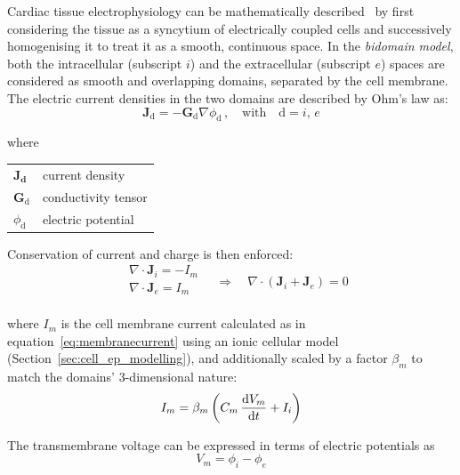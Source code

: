 \vspace{0.2cm}
Cardiac tissue electrophysiology can be mathematically described~\cite{Clayton:2011} by first considering the tissue as a syncytium of electrically coupled cells and successively homogenising it to treat it as a smooth, continuous space. In the \textit{bidomain model}, both the intracellular (subscript $i$) and the extracellular (subscript $e$) spaces are considered as smooth and overlapping domains, separated by the cell membrane. The electric current densities in the two domains are described by Ohm's law as:
%
\begin{equation}\label{eq:ohmslaw}
    \mathbf{J}_{\text{d}} = -\mathbf{G}_{\text{d}}\nabla\phi_{\text{d}}\,,\quad\text{with}\quad \text{d}=i,\,e
\end{equation}

\noindent
where

\vspace{0.2cm}
\begin{tabular}{ll}
    $\mathbf{\mathbf{J}_{\text{d}}}$ & current density \\
    $\mathbf{G}_{\text{d}}$ & conductivity tensor \\
    $\phi_{\text{d}}$ & electric potential \\
\end{tabular}

\vspace{0.2cm}\noindent
Conservation of current and charge is then enforced:
%
\begin{equation}
    \begin{aligned}
        & \nabla\cdot\mathbf{J}_i = -I_m \\
        & \nabla\cdot\mathbf{J}_e =  I_m \\
    \end{aligned}\quad\Rightarrow\quad \nabla\cdot(\mathbf{J}_i+\mathbf{J}_e) = 0
\end{equation}

\noindent
where $I_m$ is the cell membrane current calculated as in equation~\eqref{eq:membranecurrent} using an ionic cellular model (Section~\ref{sec:cell_ep_modelling}), and additionally scaled by a factor $\beta_m$ to match the domains' $3$-dimensional nature:
%
\begin{equation}\label{eq:membranecurrentsc}
    I_m = \beta_m\left(C_m\,\dfrac{\mathrm{d}{V_m}}{\mathrm{d}{t}} + I_i\right)
\end{equation}

\noindent
The transmembrane voltage can be expressed in terms of electric potentials as
%
\begin{equation}
    V_m = \phi_i - \phi_e
\end{equation}

